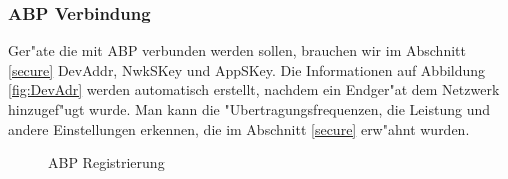 \subsubsection{ABP Verbindung}
Ger"ate die mit ABP verbunden werden sollen, brauchen wir im Abschnitt
\ref{secure} DevAddr, NwkSKey und AppSKey.
Die Informationen auf Abbildung \ref{fig:DevAdr} werden automatisch
erstellt, nachdem ein Endger"at dem Netzwerk hinzugef"ugt wurde. Man
kann die "Ubertragungsfrequenzen, die Leistung und andere Einstellungen
erkennen, die im Abschnitt \ref{secure} erw"ahnt wurden. 
	\begin{figure}[h!]
	\centering
	\caption{ABP Registrierung}
	\end{figure}

